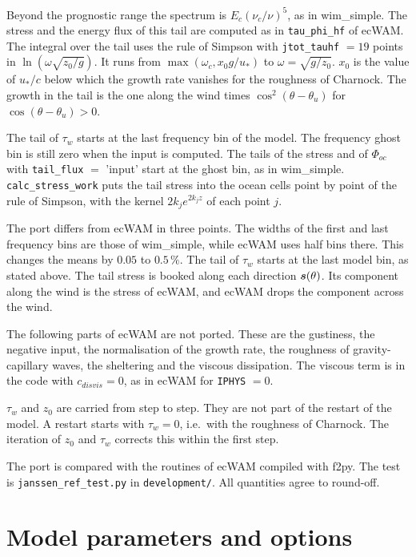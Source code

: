 \documentclass[12pt]{article}
\renewcommand{\v}[1]{{\mbox{\boldmath$ #1 $}}}  %
\begin{document}
Beyond the prognostic range the spectrum is $E_c (\nu_c/\nu)^5$, as in wim\_simple.
The stress and the energy flux of this tail are computed as in \verb|tau_phi_hf| of ecWAM.
The integral over the tail uses the rule of Simpson with \verb|jtot_tauhf| $=19$ points in $\ln(\omega \sqrt{z_0/g})$.
It runs from $\max(\omega_c, x_0 g/u_*)$ to $\omega = \sqrt{g/z_0}$.
$x_0$ is the value of $u_*/c$ below which the growth rate vanishes for the roughness of Charnock.
The growth in the tail is the one along the wind times $\cos^2(\theta - \theta_u)$ for $\cos(\theta - \theta_u) > 0$.

The tail of $\tau_w$ starts at the last frequency bin of the model.
The frequency ghost bin is still zero when the input is computed.
The tails of the stress and of $\Phi_{oc}$ with \verb|tail_flux| $=$ 'input' start at the ghost bin, as in wim\_simple.
\verb|calc_stress_work| puts the tail stress into the ocean cells point by point of the rule of Simpson, with the kernel $2 k_j e^{2 k_j z}$ of each point $j$.

The port differs from ecWAM in three points.
The widths of the first and last frequency bins are those of wim\_simple, while ecWAM uses half bins there.
This changes the means by $0.05$ to $0.5\,\%$.
The tail of $\tau_w$ starts at the last model bin, as stated above.
The tail stress is booked along each direction $\v s(\theta)$.
Its component along the wind is the stress of ecWAM, and ecWAM drops the component across the wind.

The following parts of ecWAM are not ported.
These are the gustiness, the negative input, the normalisation of the growth rate, the roughness of gravity-capillary waves, the sheltering and the viscous dissipation.
The viscous term is in the code with $c_{disvis} = 0$, as in ecWAM for \verb|IPHYS| $=0$.

$\tau_w$ and $z_0$ are carried from step to step.
They are not part of the restart of the model.
A restart starts with $\tau_w = 0$, i.e.\ with the roughness of Charnock.
The iteration of $z_0$ and $\tau_w$ corrects this within the first step.

The port is compared with the routines of ecWAM compiled with f2py.
The test is \verb|janssen_ref_test.py| in \verb|development/|.
All quantities agree to round-off.

\section*{Model parameters and options}
\end{document}
